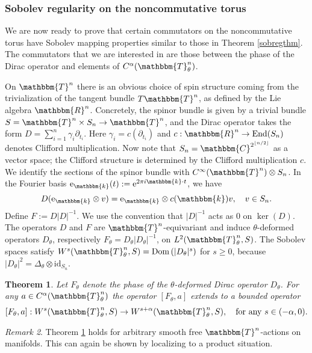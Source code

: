 \documentclass[10pt]{amsart}
\newtheorem{thm}{Theorem}[section]
\theoremstyle{remark}
\newtheorem{remark}[thm]{Remark}
\theoremstyle{definition}
\begin{document}
\subsubsection{Sobolev regularity on the noncommutative torus}

We are now ready to prove that certain commutators on the noncommutative torus have Sobolev mapping properties similar to those in Theorem \ref{sobregthm}. The commutators that we are interested in are those between the phase of the Dirac operator and elements of $C^\alpha({\mathbbm{T}}^n_\theta)$.

On ${\mathbbm{T}}^n$ there is an obvious choice of spin structure coming from the trivialization of the tangent bundle $T{\mathbbm{T}}^n$, as defined by the Lie algebra ${\mathbbm{R}}^n$. Concretely, the spinor bundle is given by a trivial bundle $S={\mathbbm{T}}^n\times S_n\to {\mathbbm{T}}^n$, and the Dirac operator takes the form $D=\sum_{i=1}^n\gamma_i \partial_{t_i}$. Here $\gamma_i=c(\partial_{t_i})$ and $c:{\mathbbm{R}}^n\to {\mathrm{End}}(S_n)$ denotes Clifford multiplication. Now note that $S_n={\mathbbm{C}}^{2^{\lfloor n/2\rfloor}}$ as a vector space; the Clifford structure is determined by the Clifford multiplication $c$. We identify the sections of the spinor bundle with $C^\infty({\mathbbm{T}}^n)\otimes S_n$. In the Fourier basis ${\mathrm{e}}_\mathbbm{k}(t):={\mathrm{e}}^{2\pi i \mathbbm{k}\cdot t}$, we have 
$$ D({\mathrm{e}}_\mathbbm{k}\otimes v)={\mathrm{e}}_\mathbbm{k}\otimes c(\mathbbm{k})v, \quad v\in S_n.$$
Define $F:=D|D|^{-1}$. We use the convention that $|D|^{-1}$ acts as $0$ on $\ker(D)$. The operators $D$ and $F$ are ${\mathbbm{T}}^n$-equivariant and induce $\theta$-deformed operators $D_\theta$, respectively $F_\theta=D_\theta|D_\theta|^{-1}$, on $L^2({\mathbbm{T}}^n_\theta,S)$. The Sobolev spaces satisfy $W^s({\mathbbm{T}}^n_\theta,S)={\mathrm{Dom}\,}(|D_\theta|^{s})$ for $s\geq 0$, because $|D_\theta|^2=\Delta_\theta\otimes{ \mathrm{id}}_{S_n}$.

\begin{thm}
\label{sobregtheta}
Let $F_\theta$ denote the phase of the $\theta$-deformed Dirac operator $D_\theta$. For any $a\in C^\alpha({\mathbbm{T}}^n_\theta)$ the operator $[F_\theta,a]$ extends to a bounded operator 
$$[F_\theta,a]:W^s({\mathbbm{T}}^n_\theta,S)\to W^{s+\alpha}({\mathbbm{T}}^n_\theta,S),\quad\mbox{for any $s\in (-\alpha,0)$}.$$
\end{thm}

\begin{remark}
Theorem \ref{sobregtheta} holds for arbitrary smooth free ${\mathbbm{T}}^n$-actions on manifolds. This can again be shown by localizing to a product situation. 
\end{remark}
\end{document}
